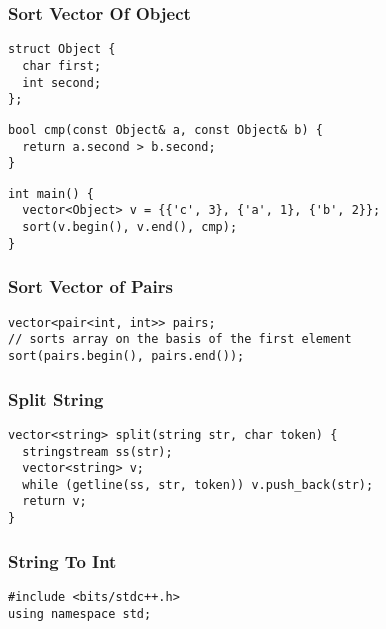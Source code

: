 \documentclass[twoside]{article}
\newcommand{\fileTitleStyle}{\large\underline}
\begin{document}
\begin{multicols*}{2}
\subsubsection*{Sort Vector Of Object}
\begin{verbatim}
struct Object {
  char first;
  int second;
};
\end{verbatim}
\vspace{-12pt}
\begin{verbatim}
bool cmp(const Object& a, const Object& b) {
  return a.second > b.second;
}
\end{verbatim}
\vspace{-12pt}
\begin{verbatim}
int main() {
  vector<Object> v = {{'c', 3}, {'a', 1}, {'b', 2}};
  sort(v.begin(), v.end(), cmp);
}
\end{verbatim}

\subsubsectionfont{\centering\bfseries\Large}
\subsubsectionfont{\fileTitleStyle}
\subsubsection*{Sort Vector of Pairs}
\begin{verbatim}
vector<pair<int, int>> pairs;
// sorts array on the basis of the first element
sort(pairs.begin(), pairs.end());

\end{verbatim}

\subsubsectionfont{\centering\bfseries\Large}
\subsubsectionfont{\fileTitleStyle}
\subsubsection*{Split String}
\begin{verbatim}
vector<string> split(string str, char token) {
  stringstream ss(str);
  vector<string> v;
  while (getline(ss, str, token)) v.push_back(str);
  return v;
}
\end{verbatim}

\subsubsectionfont{\centering\bfseries\Large}
\subsubsectionfont{\fileTitleStyle}
\subsubsection*{String To Int}
\begin{verbatim}
#include <bits/stdc++.h>
using namespace std;


\end{verbatim}
\end{multicols*}
\end{document}
